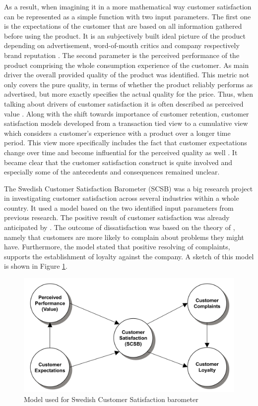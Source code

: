 As a result, when imagining it in a more mathematical way customer satisfaction can be represented as a simple function with two input parameters. The first one is the expectations of the customer that are based on all information gathered before using the product. It is an subjectively built ideal picture of the product depending on advertisement, word-of-mouth critics and company respectively brand reputation \cite{johnson2001evolution} \cite{neckel2015}. The second parameter is the perceived performance of the product comprising the whole consumption experience of the customer. As main driver the overall provided quality of the product was identified. This metric not only covers the pure quality, in terms of whether the product reliably performs as advertised, but more exactly specifies the actual quality for the price. Thus, when talking about drivers of customer satisfaction it is often described as perceived value \cite{johnson2001evolution} \cite{fornell1992national}. Along with the shift towards importance of customer retention, customer satisfaction models developed from a transaction tied view to a cumulative view which considers a customer's experience with a product over a longer time period. This view more specifically includes the fact that customer expectations change over time and become influential for the perceived quality as well \cite{johnson1996expectations}. It became clear that the customer satisfaction construct is quite involved and especially some of the antecedents and consequences remained unclear. 

The Swedish Customer Satisfaction Barometer (SCSB) was a big research project in investigating customer satisfaction across several industries within a whole country. It used a model based on the two identified input parameters from previous research. The positive result of customer satisfaction was already anticipated by \cite{bolton1998dynamic} \cite{gustafsson2005effects}. The outcome of dissatisfaction was based on the theory of \cite{hulett1971exit}, namely that customers are more likely to complain about problems they might have. Furthermore, the model stated that positive resolving of complaints, supports the establishment of loyalty against the company. A sketch of this model is shown in Figure \ref{fig:scsb}.

\begin{figure}
	\centering
	\includegraphics[width=1.0\textwidth]{img/scsb.png}
	\caption{Model used for Swedish Customer Satisfaction barometer \cite{fornell1992national}}
	\label{fig:scsb}
\end{figure} 

